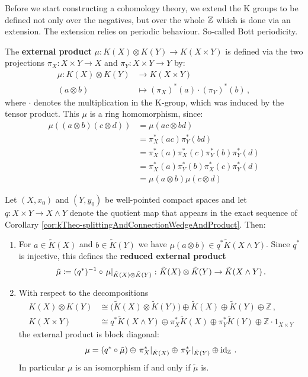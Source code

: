 Before we start constructing a cohomology theory, we extend the K groups to be defined not only over the negatives, but over the whole $\mathbb{Z}$ which is done via an extension. The extension relies on periodic behaviour. So-called Bott periodicity.
\begin{definition}
	The \textbf{external product } $\mu:K(X)\otimes K(Y)\to K(X\times Y)$ is defined via the two projections $\pi_X:X\times Y\to X$ and $\pi_Y:X\times Y\to Y$ by:
	\begin{align*}
		\mu:K(X)\otimes K(Y)&\to K(X\times Y)\\
		(a\otimes b)&\mapsto (\pi_X)^*(a)\cdot (\pi_Y)^*(b) \, ,
	\end{align*} where $\cdot$ denotes the multiplication in the K-group, which was induced by the tensor product. This $\mu$ is a ring homomorphism, since:
	\begin{align*}
		\mu((a \otimes b)(c \otimes d)) &= \mu(ac \otimes bd) \\
		&= \pi_X^*(ac)\pi_Y^*(bd) \\
		&= \pi_X^*(a)\pi_X^*(c)\pi_Y^*(b)\pi_Y^*(d) \\
		&= \pi_X^*(a)\pi_Y^*(b)\pi_X^*(c)\pi_Y^*(d) \\
		&= \mu(a \otimes b)\mu(c \otimes d)
	\end{align*}
\end{definition}
\begin{proposition}\label{prop:kTheo-reducedExternalProduct} 
Let $(X,x_0)$ and $(Y,y_0)$ be well-pointed compact spaces and let
$q\colon X\times Y\to X\wedge Y$ denote the quotient map that appears in the exact sequence of Corollary \ref{cor:kTheo-splittingAndConnectionWedgeAndProduct}. Then:
\begin{enumerate}
\item For $a\in\tilde K(X)$ and $b\in\tilde K(Y)$ we have
	$\mu(a\otimes b)\in q^*\tilde K(X\wedge Y)$. Since $q^*$ is injective,
	this defines the \textbf{reduced external product}
	\begin{equation*}
		\tilde\mu\coloneq(q^*)^{-1}\circ
		\left.\mu\right|_{\tilde K(X)\otimes\tilde K(Y)}\colon
		\tilde K(X)\otimes\tilde K(Y)\to\tilde K(X\wedge Y)\,.
	\end{equation*}
\item With respect to the decompositions
	\begin{align*}
		K(X)\otimes K(Y)
		&\cong \big(\tilde K(X)\otimes\tilde K(Y)\big)\oplus
		\tilde K(X)\oplus\tilde K(Y)\oplus\mathbb{Z}\,,\\
		K(X\times Y)
		&\cong q^*\tilde K(X\wedge Y)\oplus\pi_X^*\tilde K(X)
		\oplus\pi_Y^*\tilde K(Y)\oplus\mathbb{Z}\!\cdot\!1_{X\times Y}
	\end{align*}
	the external product is block diagonal:
	\begin{equation*}
		\mu=(q^*\circ\tilde\mu)\oplus\left.\pi_X^*\right|_{\tilde K(X)}
		\oplus\left.\pi_Y^*\right|_{\tilde K(Y)}\oplus\operatorname{\mathrm{id}}_{\mathbb{Z}}\,.
	\end{equation*}
	In particular $\mu$ is an isomorphism if and only if $\tilde\mu$ is.
\end{enumerate}
\end{proposition}
